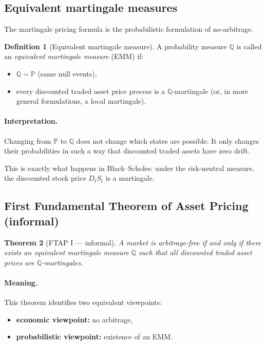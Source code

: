 \documentclass[11pt]{article}
\newcommand{\Pbb}{\mathbb{P}}
\newcommand{\Qbb}{\mathbb{Q}}
\newcommand{\1}{\mathbf{1}}
\theoremstyle{plain}
\newtheorem{theorem}{Theorem}[section]
\theoremstyle{definition}
\newtheorem{definition}[theorem]{Definition}
\theoremstyle{remark}
\begin{document}
\subsection{Equivalent martingale measures}

The martingale pricing formula is the probabilistic formulation of no-arbitrage.

\begin{definition}[Equivalent martingale measure]
A probability measure \(\Qbb\) is called an \emph{equivalent martingale measure} (EMM) if:
\begin{itemize}
    \item \(\Qbb\sim\Pbb\) (same null events),
    \item every discounted traded asset price process is a \(\Qbb\)-martingale
    (or, in more general formulations, a local martingale).
\end{itemize}
\end{definition}

\paragraph{Interpretation.}
Changing from \(\Pbb\) to \(\Qbb\) does not change which states are possible.
It only changes their probabilities in such a way that discounted traded assets have zero drift.

This is exactly what happens in Black--Scholes:
under the risk-neutral measure, the discounted stock price \(D_tS_t\) is a martingale.

\subsection{First Fundamental Theorem of Asset Pricing (informal)}

\begin{theorem}[FTAP I --- informal]
A market is arbitrage-free if and only if there exists an equivalent martingale measure \(\Qbb\) such that all discounted traded asset prices are \(\Qbb\)-martingales.
\end{theorem}

\paragraph{Meaning.}
This theorem identifies two equivalent viewpoints:
\begin{itemize}
    \item \textbf{economic viewpoint:} no arbitrage,
    \item \textbf{probabilistic viewpoint:} existence of an EMM.
\end{itemize}
\end{document}
